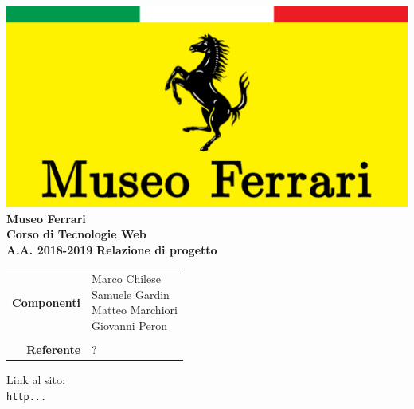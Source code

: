 


\begin{titlepage}
\thispagestyle{empty}

\begin{center}

\includegraphics[scale=0.25]{Images/logo.pdf}\\ 
\large \textbf{Museo Ferrari\\ \small Corso di Tecnologie Web\\ A.A. 2018-2019}
\vfill
\Huge \textbf{Relazione di progetto}
\vfill
\large
\renewcommand{\arraystretch}{1.3}
\begin{tabular}{r|l}
\textbf{Componenti} & \parbox[t]{5cm}{Marco Chilese\\Samuele Gardin\\Matteo Marchiori\\Giovanni Peron}\\
\-\\
\textbf{Referente} & \parbox[t]{5cm}{?}\\
\end{tabular}
\vfill
\small
Link al sito:\\
\texttt{http...}
\end{center}
\end{titlepage}

\pagebreak

\tableofcontents

\pagebreak




\pagebreak



\pagebreak



\pagebreak



\pagebreak





\pagebreak




